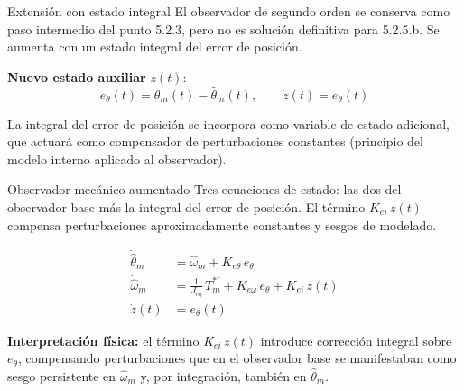\documentclass[aspectratio=169,t]{beamer}
\begin{document}
\begin{frame}{Extensión con estado integral}
{\small\color{uncGray}El observador de segundo orden se conserva como paso intermedio del punto 5.2.3, pero no es solución definitiva para 5.2.5.b. Se aumenta con un estado integral del error de posición.}\par
\vspace{10mm}

\textbf{Nuevo estado auxiliar} $z(t)$:
\begin{equation*}
e_\theta(t) = \theta_m(t) - \hat{\theta}_m(t),
\qquad
\dot{z}(t) = e_\theta(t)
\end{equation*}

\vspace{8mm}
{\small La integral del error de posición se incorpora como variable de estado adicional, que actuará como compensador de perturbaciones constantes (principio del modelo interno aplicado al observador).}
\end{frame}

\begin{frame}{Observador mecánico aumentado}
{\small\color{uncGray}Tres ecuaciones de estado: las dos del observador base más la integral del error de posición. El término $K_{ei}\,z(t)$ compensa perturbaciones aproximadamente constantes y sesgos de modelado.}\par
\vspace{6mm}

\begin{align*}
\dot{\hat{\theta}}_m &= \hat{\omega}_m + K_{e\theta}\,e_\theta \\[3pt]
\dot{\hat{\omega}}_m &= \tfrac{1}{J_{eq}}\,T_m^{*\prime} + K_{e\omega}\,e_\theta + K_{ei}\,z(t) \\[3pt]
\dot{z}(t) &= e_\theta(t)
\end{align*}

\vspace{4mm}
{\small \textbf{Interpretación física:} el término $K_{ei}\,z(t)$ introduce corrección integral sobre $e_\theta$, compensando perturbaciones que en el observador base se manifestaban como sesgo persistente en $\hat\omega_m$ y, por integración, también en $\hat\theta_m$.}
\end{frame}
\end{document}

